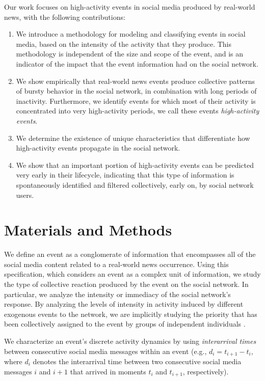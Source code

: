 Our work focuses on high-activity events in social media produced by
real-world news, with the following contributions:
\begin{enumerate}

\item We introduce a methodology for modeling and classifying
events in social media, based on the intensity of the activity that they
produce. This methodology is independent of the size and scope of the event,
and is an indicator of the impact that the event information had on the social network.

\item We show empirically that real-world news events produce collective
patterns of bursty behavior in the social network, in combination with long periods of
inactivity. Furthermore, we identify events for which most of their activity
is concentrated into very high-activity periods, we call these events {\em
high-activity events}.

\item We determine the existence of unique characteristics that
differentiate how high-activity events propagate in the social network.

\item We show that an important portion of high-activity events can be
predicted very early in their lifecycle, indicating that this type
of information is spontaneously identified and filtered collectively, early
on, by social network users.

\end{enumerate}
\section{Materials and Methods}

We define an event as a conglomerate of information that encompasses
all of the social media content related to a real-world news
occurrence. Using this specification, which considers an event as a
complex unit of information, we study the type of collective reaction
produced by the event on the social network. In particular, we analyze 
the intensity or immediacy of the social network's response. 
By analyzing the levels of intensity in activity induced by different exogenous
events to the network, we are implicitly studying the priority that has been
collectively assigned to the event by groups of
independent individuals \cite{barabasi2005origin, karsai2012universal}. 

We characterize an event's discrete activity dynamics by using
\emph{interarrival times} between consecutive social media messages
within an event (e.g., $d_i = t_{i+1}-t_i$, where $d_i$ denotes the
interarrival time between two consecutive social media messages $i$
and $i+1$ that arrived in moments $t_i$ and $t_{i+1}$, respectively).


